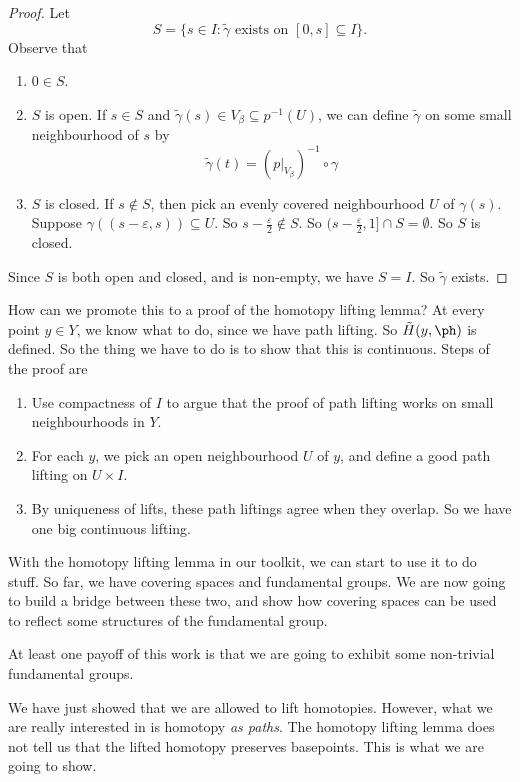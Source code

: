 \documentclass[a4paper]{article}
\begin{document}
\begin{proof}
  Let
  \[
    S = \{s \in I: \tilde{\gamma}\text{ exists on }[0, s] \subseteq I\}.
  \]
  Observe that
  \begin{enumerate}
    \item $0\in S$.
    \item $S$ is open. If $s\in S$ and $\tilde{\gamma}(s) \in V_\beta \subseteq p^{-1}(U)$, we can define $\tilde{\gamma}$ on some small neighbourhood of $s$ by
      \[
        \tilde{\gamma}(t) = (p|_{V_\beta})^{-1}\circ \gamma
      \]

    \item $S$ is closed. If $s \not \in S$, then pick an evenly covered neighbourhood $U$ of $\gamma(s)$. Suppose $\gamma((s - \varepsilon, s)) \subseteq U$. So $s - \frac{\varepsilon}{2} \not \in S$. So $(s - \frac{\varepsilon}{2}, 1] \cap S = \emptyset$.  So $S$ is closed.
  \end{enumerate}
  Since $S$ is both open and closed, and is non-empty, we have $S = I$. So $\tilde{\gamma}$ exists.
\end{proof}
How can we promote this to a proof of the homotopy lifting lemma? At every point $y\in Y$, we know what to do, since we have path lifting. So $\tilde{H}(y, \ph)$ is defined. So the thing we have to do is to show that this is continuous. Steps of the proof are
\begin{enumerate}
  \item Use compactness of $I$ to argue that the proof of path lifting works on small neighbourhoods in $Y$.
  \item For each $y$, we pick an open neighbourhood $U$ of $y$, and define a good path lifting on $U\times I$.
  \item By uniqueness of lifts, these path liftings agree when they overlap. So we have one big continuous lifting.
\end{enumerate}

With the homotopy lifting lemma in our toolkit, we can start to use it to do stuff. So far, we have covering spaces and fundamental groups. We are now going to build a bridge between these two, and show how covering spaces can be used to reflect some structures of the fundamental group.

At least one payoff of this work is that we are going to exhibit some non-trivial fundamental groups.

We have just showed that we are allowed to lift homotopies. However, what we are really interested in is homotopy \emph{as paths}. The homotopy lifting lemma does not tell us that the lifted homotopy preserves basepoints. This is what we are going to show.
\end{document}
